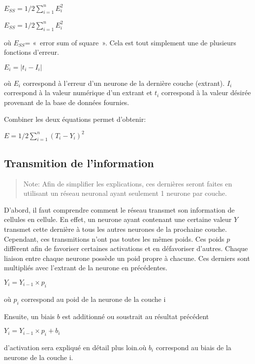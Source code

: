 \documentclass[letterpaper,10pt,french]{sphinxmanual}
\begin{document}
\(E_{SS}=1/2\sum_{i=1}^nE_i^2 \) 

\(E_{SS}=1/2\sum_{i=1}^nE_i^2 \) 

où \(E_{SS}\)= « error sum of square ». Cela est tout simplement une de plusieurs fonctions d’erreur.

\(E_i =|{t_i-I_i}|\) 

où \(E_i\) correspond à l’erreur d’un neurone de la dernière couche (extrant). \(I_i\) correspond à la valeur numérique
d’un extrant et \(t_i\) correspond à la valeur désirée provenant de la base de données fournies.

Combiner les deux équations permet d’obtenir:

\(E=1/2\sum_{i=1}^n({T_i-Y_i})^2\) 


\subsection{Transmition de l’information}
\label{\detokenize{training:transmition-de-l-information}}\begin{quote}

Note: Afin de simplifier les explications, ces dernières seront faites en utilisant un réseau neuronal ayant seulement 1 neurone par couche.
\end{quote}

D’abord, il faut comprendre comment le réseau transmet son information de cellules en cellule. En effet,
un neurone ayant contenant une certaine valeur \(Y\) transmet cette dernière à tous les autres neurones de
la prochaine couche. Cependant, ces transmitions n’ont pas toutes les mêmes poids. Ces poids \(p\) diffèrent
afin de favoriser certaines activations et en défavoriser d’autres. Chaque liaison entre chaque neurone possède
un poid propre à chacune. Ces derniers sont multipliés avec l’extrant de la neurone en précédentes.

\(Y_{i} = Y_{i-1}\times p_{i}\)

où \(p_{i}\) correspond au poid de la neurone de la couche i

Ensuite, un biais \(b\) est additionné ou soustrait au résultat précédent

\(Y_i = Y_{i-1}\times p_{i} + b_i\) 

d’activation sera expliqué en détail plus loin.où \(b_i\) correspond au biais de la neurone de la couche i.
\end{document}
